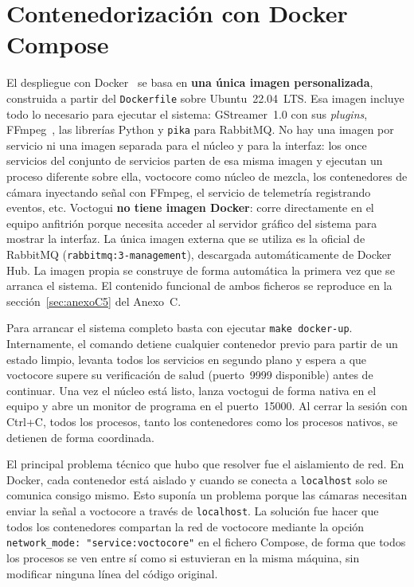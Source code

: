 \section{Contenedorización con Docker Compose}
\label{sec:docker}

El despliegue con Docker~\cite{merkel2014docker,docker_compose_docs} se basa en
\textbf{una única imagen personalizada}, construida a partir del \texttt{Dockerfile}
sobre Ubuntu~22.04~\ac{LTS}. Esa imagen incluye todo lo necesario para ejecutar el
sistema: GStreamer~1.0 con sus \textit{plugins}, FFmpeg~\cite{ffmpeg_project}, las
librerías Python y \texttt{pika} para RabbitMQ. No hay una imagen por servicio ni
una imagen separada para el núcleo y para la interfaz: los once servicios del
conjunto de servicios parten de esa misma imagen y ejecutan un proceso diferente sobre
ella, voctocore como núcleo de mezcla, los contenedores de cámara inyectando señal
con FFmpeg, el servicio de telemetría registrando eventos, etc.
Voctogui \textbf{no tiene imagen Docker}: corre directamente en el equipo anfitrión
porque necesita acceder al servidor gráfico del sistema para mostrar la interfaz.
La única imagen externa que se utiliza es la oficial de RabbitMQ
(\texttt{rabbitmq:3-management}), descargada automáticamente de Docker Hub.
La imagen propia se construye de forma automática la primera vez que se arranca
el sistema. El contenido funcional de ambos ficheros se reproduce en la
sección~\ref{sec:anexoC5} del Anexo~C.

Para arrancar el sistema completo basta con ejecutar \texttt{make docker-up}.
Internamente, el comando detiene cualquier contenedor previo para partir de un
estado limpio, levanta todos los servicios en segundo plano y espera a que
voctocore supere su verificación de salud (puerto~9999 disponible) antes de
continuar. Una vez el núcleo está listo, lanza voctogui de forma nativa en el
equipo y abre un monitor de programa en el puerto~15000. Al cerrar la sesión con
Ctrl+C, todos los procesos, tanto los contenedores como los procesos nativos, se
detienen de forma coordinada.

El principal problema técnico que hubo que resolver fue el aislamiento de red. En
Docker, cada contenedor está aislado y cuando se conecta a \texttt{localhost} solo
se comunica consigo mismo. Esto suponía un problema porque las cámaras necesitan
enviar la señal a voctocore a través de \texttt{localhost}. La solución fue hacer
que todos los contenedores compartan la red de voctocore mediante la opción
\texttt{network\_mode: "service:voctocore"} en el fichero Compose, de forma que
todos los procesos se ven entre sí como si estuvieran en la misma máquina, sin
modificar ninguna línea del código original.

